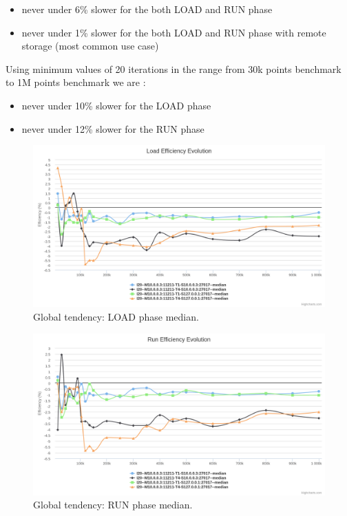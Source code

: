 \documentclass[a4paper,11pt]{report}
\begin{document}
\begin{itemize}
\item
never under 6\% slower for the both LOAD and RUN phase
\item
never under 1\% slower for the both LOAD and RUN phase with remote storage (most common use case)
\end{itemize}

Using minimum values of 20 iterations in the range from 30k points benchmark to 1M points benchmark we are :

\begin{itemize}
\item
never under 10\% slower for the LOAD phase
\item
never under 12\% slower for the RUN phase
\end{itemize}

\begin{figure}[ht]
\begin{center}
\includegraphics[width=1\linewidth]{images/evaluation/global-withoutMlocal-load.png}
\caption{Global tendency: LOAD phase median.}
\label{global-withoutMlocal-load}
\end{center}
\end{figure}

\begin{figure}[ht]
\begin{center}
\includegraphics[width=1\linewidth]{images/evaluation/global-withoutMlocal-run.png}
\caption{Global tendency: RUN phase median.}
\label{global-withoutMlocal-run}
\end{center}
\end{figure}
\end{document}
